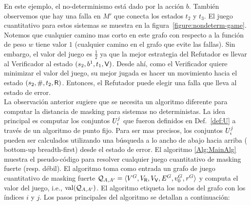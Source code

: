 En este ejemplo, el no-determinismo está dado por la acción $b$. También observemos que hay una falla en $M'$ que conecta los estados $t_2$ y $t_3$. El juego cuantitativo para estos sistemas se muestra en la figura~\ref{figure:nondeterm-game}. Notemos que cualquier camino mas corto en este grafo con respecto a la función de peso $w$ tiene valor $1$ (cualquier camino en el grafo que evite las fallas). Sin embargo, el valor del juego es $\frac{1}{2}$ ya que la mejor estrategia del Refutador es llevar al Verificador al estado $(s_2,b^1,t_1,\mathsf{V})$. 
Desde ahí, como el Verificador quiere minimizar el valor del juego, su mejor jugada es hacer un movimiento hacia el estado $(s_2,\#,t_2,\mathsf{R})$. Entonces, el Refutador puede elegir una falla que lleva al estado de error. \\

La observación anterior sugiere que se necesita un algoritmo diferente para computar la distancia de masking para sistemas no deterministas. 
La idea principal es computar los conjuntos $U^j_i$ que fueron definidos en Def.~\ref{def:U} a través de un algoritmo de punto fijo. Para ser mas precisos, los conjuntos $U^j_i$ pueden ser calculados utilizando una búsqueda a lo ancho de abajo hacia arriba ( 
bottom-up breadth-first) desde el estado de error. 
El algoritmo \ref{Alg:MainAlg} muestra el pseudo-código para resolver cualquier juego cuantitativo de masking fuerte (resp. débil). 
El algoritmo toma como entrada un grafo de juego cuantitativo de masking fuerte  $\mathcal{Q}_{A, A'} = \langle V^G, V_{\mathsf{R}}, V_{\mathsf{V}},E^G, v_0^G, \mathit{r}^G \rangle$ 
y computa el valor del juego, i.e., $\mathop{\textup{val}}(\mathcal{Q}_{A, A'})$.
El algoritmo etiqueta los nodos del grafo con los índices $i$ y $j$. 
Los pasos principales del algoritmo se detallan a continuación:


